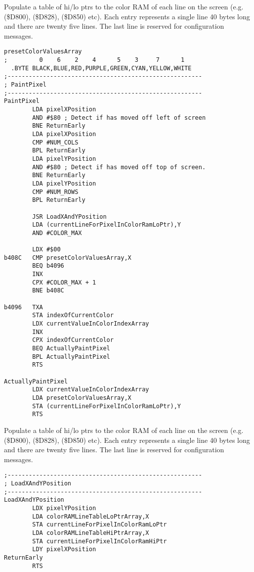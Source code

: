 Populate a table of hi/lo ptrs to the color RAM
of each line on the screen (e.g. \icode(\$D800), \icode(\$D828), \icode(\$D850) etc). Each entry represents a single
line 40 bytes long and there are twenty five lines.
The last line is reserved for configuration messages.



\clearpage
\begin{lstlisting}
presetColorValuesArray
;         0    6    2    4      5    3     7      1
  .BYTE BLACK,BLUE,RED,PURPLE,GREEN,CYAN,YELLOW,WHITE
;-------------------------------------------------------
; PaintPixel
;-------------------------------------------------------
PaintPixel   
        LDA pixelXPosition
        AND #$80 ; Detect if has moved off left of screen
        BNE ReturnEarly
        LDA pixelXPosition
        CMP #NUM_COLS
        BPL ReturnEarly
        LDA pixelYPosition
        AND #$80 ; Detect if has moved off top of screen.
        BNE ReturnEarly
        LDA pixelYPosition
        CMP #NUM_ROWS
        BPL ReturnEarly

        JSR LoadXAndYPosition
        LDA (currentLineForPixelInColorRamLoPtr),Y
        AND #COLOR_MAX

        LDX #$00
b408C   CMP presetColorValuesArray,X
        BEQ b4096
        INX 
        CPX #COLOR_MAX + 1
        BNE b408C

b4096   TXA 
        STA indexOfCurrentColor
        LDX currentValueInColorIndexArray
        INX 
        CPX indexOfCurrentColor
        BEQ ActuallyPaintPixel
        BPL ActuallyPaintPixel
        RTS 

ActuallyPaintPixel   
        LDX currentValueInColorIndexArray
        LDA presetColorValuesArray,X
        STA (currentLineForPixelInColorRamLoPtr),Y
        RTS 
\end{lstlisting}
\clearpage

Populate a table of hi/lo ptrs to the color RAM
of each line on the screen (e.g. \icode(\$D800), \icode(\$D828), \icode(\$D850) etc). Each entry represents a single
line 40 bytes long and there are twenty five lines.
The last line is reserved for configuration messages.
\begin{lstlisting}
;-------------------------------------------------------
; LoadXAndYPosition
;-------------------------------------------------------
LoadXAndYPosition   
        LDX pixelYPosition
        LDA colorRAMLineTableLoPtrArray,X
        STA currentLineForPixelInColorRamLoPtr
        LDA colorRAMLineTableHiPtrArray,X
        STA currentLineForPixelInColorRamHiPtr
        LDY pixelXPosition
ReturnEarly
        RTS 
\end{lstlisting}

